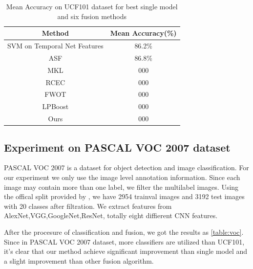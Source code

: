 \documentclass[letterpaper]{article}
\begin{document}
\begin{table}[h]\small
\centering
\label{table:ucf101}
\begin{tabular}{c|c}
\hline
Method & Mean Accuracy(\%) \\\hline
SVM on Temporal Net Features & 86.2\% \\\hline
ASF &  86.8\% \\
MKL &  000 \\
RCEC &  000 \\
FWOT &  000 \\
LPBoost &  000 \\\hline
Ours &  000 \\
\hline
\end{tabular}
\caption{Mean Accuracy on UCF101 dataset for best single model and six fusion methods}
\end{table}

\subsection{Experiment on PASCAL VOC 2007 dataset}
PASCAL VOC 2007 is a dataset for object detection and image classification. For our experiment we only use the image level annotation information. Since each image may contain more than one label, we filter the multilabel images. Using the offical split provided by \cite{pascal-voc-2007}, we have 2954 trainval images and 3192 test images with 20 classes after filtration. We extract features from AlexNet,VGG,GoogleNet,ResNet, totally eight diffierent CNN features.

After the procesure of classification and fusion, we got the results as \ref{table:voc}. Since in PASCAL VOC 2007 dataset, more classifiers are utilized than UCF101, it's clear that our method achieve significant improvement than single model and a slight improvement than other fusion algorithm.
\end{document}
